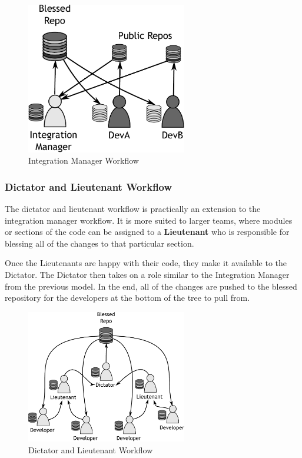 \begin{figure}[bt]
	\centering
	\includegraphics[width=7cm]{images/f-w1-d2.pdf}
	\caption{Integration Manager Workflow}
\end{figure}

\subsubsection{Dictator and Lieutenant Workflow}

The dictator and lieutenant workflow is practically an extension to the integration manager workflow.
It is more suited to larger teams, where modules or sections of the code can be assigned to a \textbf{Lieutenant} who is responsible for blessing all of the changes to that particular section.

Once the Lieutenants are happy with their code, they make it available to the Dictator.
The Dictator then takes on a role similar to the Integration Manager from the previous model.
In the end, all of the changes are pushed to the blessed repository for the developers at the bottom of the tree to pull from.

\begin{figure}[bt]
	\centering
	\includegraphics[width=7cm]{images/f-w1-d3.pdf}
	\caption{Dictator and Lieutenant Workflow}
\end{figure}

